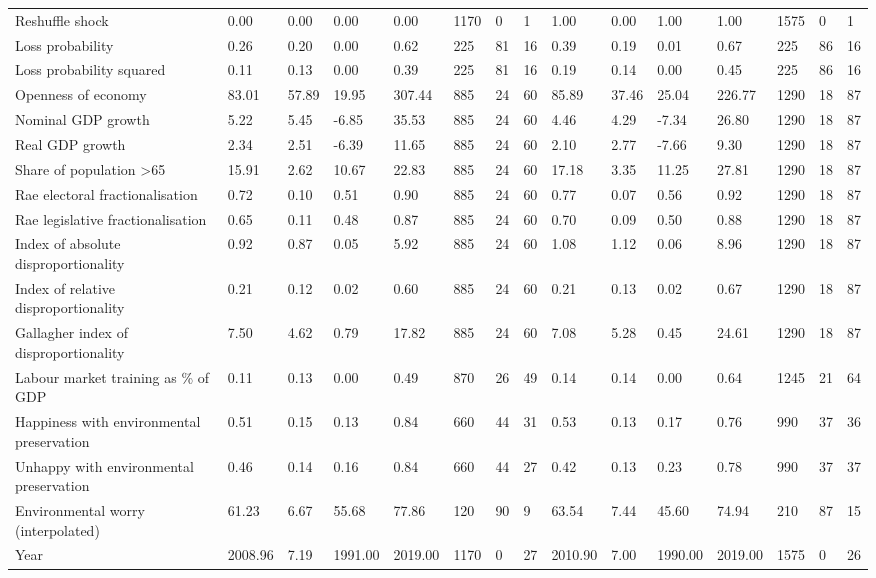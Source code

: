 \begin{longtable}{lllllllllllllll}
\addlinespace
Reshuffle shock & 0.00 & 0.00 & 0.00 & 0.00 & 1170 & 0 & 1 & 1.00 & 0.00 & 1.00 & 1.00 & 1575 & 0 & 1\\
Loss probability & 0.26 & 0.20 & 0.00 & 0.62 & 225 & 81 & 16 & 0.39 & 0.19 & 0.01 & 0.67 & 225 & 86 & 16\\
Loss probability squared & 0.11 & 0.13 & 0.00 & 0.39 & 225 & 81 & 16 & 0.19 & 0.14 & 0.00 & 0.45 & 225 & 86 & 16\\
Openness of economy & 83.01 & 57.89 & 19.95 & 307.44 & 885 & 24 & 60 & 85.89 & 37.46 & 25.04 & 226.77 & 1290 & 18 & 87\\
Nominal GDP growth & 5.22 & 5.45 & -6.85 & 35.53 & 885 & 24 & 60 & 4.46 & 4.29 & -7.34 & 26.80 & 1290 & 18 & 87\\
\addlinespace
Real GDP growth & 2.34 & 2.51 & -6.39 & 11.65 & 885 & 24 & 60 & 2.10 & 2.77 & -7.66 & 9.30 & 1290 & 18 & 87\\
Share of population >65 & 15.91 & 2.62 & 10.67 & 22.83 & 885 & 24 & 60 & 17.18 & 3.35 & 11.25 & 27.81 & 1290 & 18 & 87\\
Rae electoral fractionalisation & 0.72 & 0.10 & 0.51 & 0.90 & 885 & 24 & 60 & 0.77 & 0.07 & 0.56 & 0.92 & 1290 & 18 & 87\\
Rae legislative fractionalisation & 0.65 & 0.11 & 0.48 & 0.87 & 885 & 24 & 60 & 0.70 & 0.09 & 0.50 & 0.88 & 1290 & 18 & 87\\
Index of absolute disproportionality & 0.92 & 0.87 & 0.05 & 5.92 & 885 & 24 & 60 & 1.08 & 1.12 & 0.06 & 8.96 & 1290 & 18 & 87\\
\addlinespace
Index of relative disproportionality & 0.21 & 0.12 & 0.02 & 0.60 & 885 & 24 & 60 & 0.21 & 0.13 & 0.02 & 0.67 & 1290 & 18 & 87\\
Gallagher index of disproportionality & 7.50 & 4.62 & 0.79 & 17.82 & 885 & 24 & 60 & 7.08 & 5.28 & 0.45 & 24.61 & 1290 & 18 & 87\\
Labour market training as \% of GDP & 0.11 & 0.13 & 0.00 & 0.49 & 870 & 26 & 49 & 0.14 & 0.14 & 0.00 & 0.64 & 1245 & 21 & 64\\
Happiness with environmental preservation & 0.51 & 0.15 & 0.13 & 0.84 & 660 & 44 & 31 & 0.53 & 0.13 & 0.17 & 0.76 & 990 & 37 & 36\\
Unhappy with environmental preservation & 0.46 & 0.14 & 0.16 & 0.84 & 660 & 44 & 27 & 0.42 & 0.13 & 0.23 & 0.78 & 990 & 37 & 37\\
\addlinespace
Environmental worry (interpolated) & 61.23 & 6.67 & 55.68 & 77.86 & 120 & 90 & 9 & 63.54 & 7.44 & 45.60 & 74.94 & 210 & 87 & 15\\
Year & 2008.96 & 7.19 & 1991.00 & 2019.00 & 1170 & 0 & 27 & 2010.90 & 7.00 & 1990.00 & 2019.00 & 1575 & 0 & 26\\
\bottomrule
\end{longtable}
